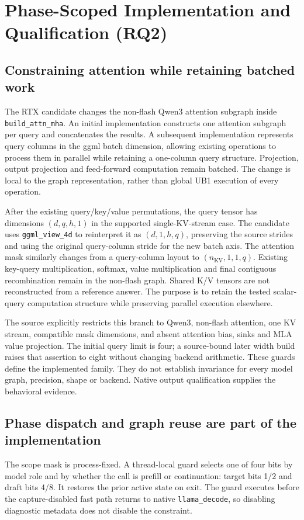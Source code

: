 \section{Phase-Scoped Implementation and Qualification (RQ2)}
\label{sec:repair}
\subsection{Constraining attention while retaining batched work}
The RTX candidate changes the non-flash Qwen3 attention subgraph inside \texttt{build\_attn\_mha}. An initial implementation constructs one attention subgraph per query and concatenates the results. A subsequent implementation represents query columns in the ggml batch dimension, allowing existing operations to process them in parallel while retaining a one-column query structure. Projection, output projection and feed-forward computation remain batched. The change is local to the graph representation, rather than global UB1 execution of every operation.

After the existing query/key/value permutations, the query tensor has dimensions $(d,q,h,1)$ in the supported single-KV-stream case. The candidate uses \texttt{ggml\_view\_4d} to reinterpret it as $(d,1,h,q)$, preserving the source strides and using the original query-column stride for the new batch axis. The attention mask similarly changes from a query-column layout to $(n_{\mathrm{KV}},1,1,q)$. Existing key-query multiplication, softmax, value multiplication and final contiguous recombination remain in the non-flash graph. Shared K/V tensors are not reconstructed from a reference answer. The purpose is to retain the tested scalar-query computation structure while preserving parallel execution elsewhere.

The source explicitly restricts this branch to Qwen3, non-flash attention, one KV stream, compatible mask dimensions, and absent attention bias, sinks and MLA value projection. The initial query limit is four; a source-bound later width build raises that assertion to eight without changing backend arithmetic. These guards define the implemented family. They do not establish invariance for every model graph, precision, shape or backend. Native output qualification supplies the behavioral evidence.

\subsection{Phase dispatch and graph reuse are part of the implementation}
The scope mask is process-fixed. A thread-local guard selects one of four bits by model role and by whether the call is prefill or continuation: target bits 1/2 and draft bits 4/8. It restores the prior active state on exit. The guard executes before the capture-disabled fast path returns to native \texttt{llama\_decode}, so disabling diagnostic metadata does not disable the constraint.

